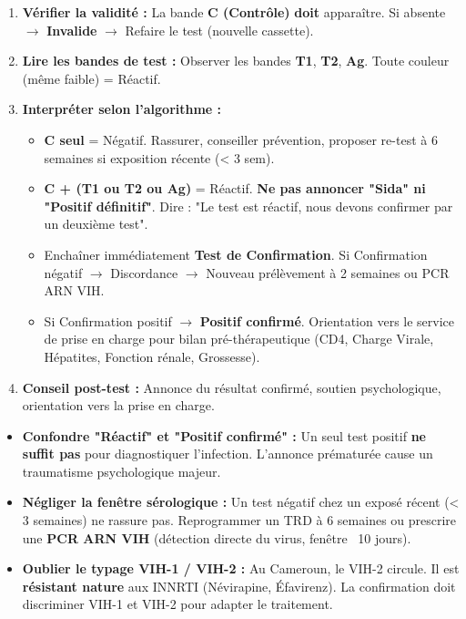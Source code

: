 \documentclass[11pt]{article}
\begin{document}
\begin{methode}
\begin{enumerate}
    \item \textbf{Vérifier la validité :} La bande \textbf{C (Contrôle)} \textbf{doit} apparaître. Si absente $\rightarrow$ \textbf{Invalide} $\rightarrow$ Refaire le test (nouvelle cassette).
    \item \textbf{Lire les bandes de test :} Observer les bandes \textbf{T1}, \textbf{T2}, \textbf{Ag}. Toute couleur (même faible) = Réactif.
    \item \textbf{Interpréter selon l'algorithme :}
    \begin{itemize}
        \item \textbf{C seul} = Négatif. Rassurer, conseiller prévention, proposer re-test à 6 semaines si exposition récente (< 3 sem).
        \item \textbf{C + (T1 ou T2 ou Ag)} = Réactif. \textbf{Ne pas annoncer "Sida" ni "Positif définitif"}. Dire : "Le test est réactif, nous devons confirmer par un deuxième test".
        \item Enchaîner immédiatement \textbf{Test de Confirmation}. Si Confirmation négatif $\rightarrow$ Discordance $\rightarrow$ Nouveau prélèvement à 2 semaines ou PCR ARN VIH.
        \item Si Confirmation positif $\rightarrow$ \textbf{Positif confirmé}. Orientation vers le service de prise en charge pour bilan pré-thérapeutique (CD4, Charge Virale, Hépatites, Fonction rénale, Grossesse).
    \end{itemize}
    \item \textbf{Conseil post-test :} Annonce du résultat confirmé, soutien psychologique, orientation vers la prise en charge.
\end{enumerate}
\end{methode}

\begin{attention}
\begin{itemize}
    \item \textbf{Confondre "Réactif" et "Positif confirmé" :} Un seul test positif \textbf{ne suffit pas} pour diagnostiquer l'infection. L'annonce prématurée cause un traumatisme psychologique majeur.
    \item \textbf{Négliger la fenêtre sérologique :} Un test négatif chez un exposé récent (< 3 semaines) ne rassure pas. Reprogrammer un TRD à 6 semaines ou prescrire une \textbf{PCR ARN VIH} (détection directe du virus, fenêtre ~10 jours).
    \item \textbf{Oublier le typage VIH-1 / VIH-2 :} Au Cameroun, le VIH-2 circule. Il est \textbf{résistant nature} aux INNRTI (Névirapine, Éfavirenz). La confirmation doit discriminer VIH-1 et VIH-2 pour adapter le traitement.
\end{itemize}
\end{attention}
\end{document}
